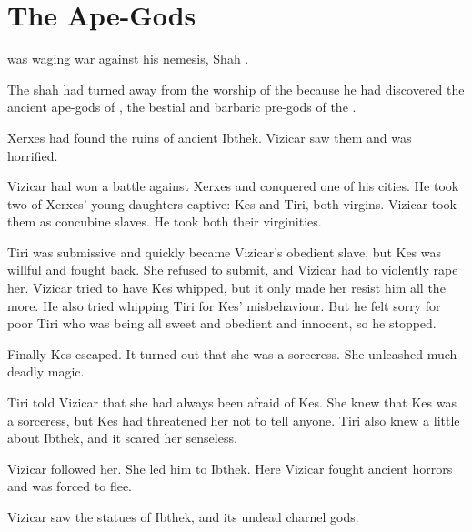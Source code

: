 \section{The Ape-Gods}
\VizicarDurasRespina was waging war against his nemesis, Shah .

The shah had turned away from the worship of the \sephiroth because he had discovered the ancient ape-gods of , the bestial and barbaric pre-\human \aryoth gods of the \nephilim.

Xerxes had found the ruins of ancient Ibthek. 
Vizicar saw them and was horrified.

Vizicar had won a battle against Xerxes and conquered one of his cities.
He took two of Xerxes' young daughters captive:
Kes and Tiri, both virgins.
Vizicar took them as concubine slaves.
He took both their virginities. 

Tiri was submissive and quickly became Vizicar's obedient slave, but Kes was willful and fought back. 
She refused to submit, and Vizicar had to violently rape her. 
Vizicar tried to have Kes whipped, but it only made her resist him all the more.
He also tried whipping Tiri for Kes' misbehaviour.
But he felt sorry for poor Tiri who was being all sweet and obedient and innocent, so he stopped. 

Finally Kes escaped. 
It turned out that she was a sorceress. 
She unleashed much deadly magic.

Tiri told Vizicar that she had always been afraid of Kes.
She knew that Kes was a sorceress, but Kes had threatened her not to tell anyone.
Tiri also knew a little about Ibthek, and it scared her senseless. 

Vizicar followed her.
She led him to Ibthek. 
Here Vizicar fought ancient horrors and was forced to flee.

Vizicar saw the statues of Ibthek, and its undead charnel gods.


